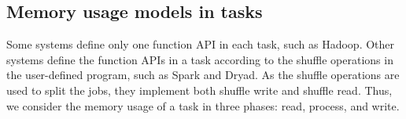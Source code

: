 


\subsection{Memory usage models in tasks}
\label{subsec:taskmodel}

Some systems define only one function API in each task, such as Hadoop. Other systems define the function APIs in a task according to the shuffle operations in the user-defined program, such as Spark and Dryad. As the shuffle operations are used to split the jobs, they implement both shuffle write and shuffle read. Thus, we consider the memory usage of a task in three phases: read, process, and write. 

